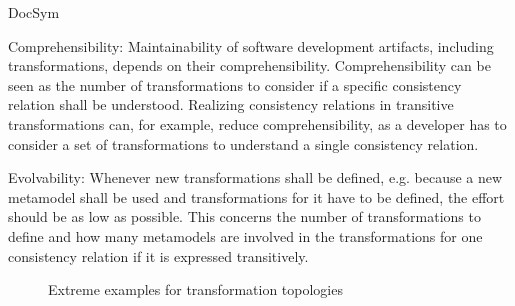 \begin{copiedFrom}{DocSym}
\begin{properdescription}
\item[Comprehensibility:]
Maintainability of software development artifacts, including transformations, depends on their comprehensibility.
Comprehensibility can be seen as the number of transformations to consider if a specific consistency relation shall be understood.
Realizing consistency relations in transitive transformations can, for example, reduce comprehensibility, as a developer has to consider a set of transformations to understand a single consistency relation. 

\item[Evolvability:]
Whenever new transformations shall be defined, e.g. because a new metamodel shall be used and transformations for it have to be defined, the effort should be as low as possible.
This concerns the number of transformations to define and how many metamodels are involved in the transformations for one consistency relation if it is expressed transitively.
\end{properdescription}


\begin{figure}
    \centering
    \begin{minipage}[b]{0.4\columnwidth}
        \centering
        
        \label{fig:properties:topologies:full}
    \end{minipage}
    \hspace{2em}
    \begin{minipage}[b]{0.4\columnwidth}
        \centering
        
        \vspace{1em}
        \label{fig:properties:topologies:tree}
    \end{minipage}
    \caption{Extreme examples for transformation topologies}
    \label{fig:properties:topologies}
\end{figure}


\end{copiedFrom}

